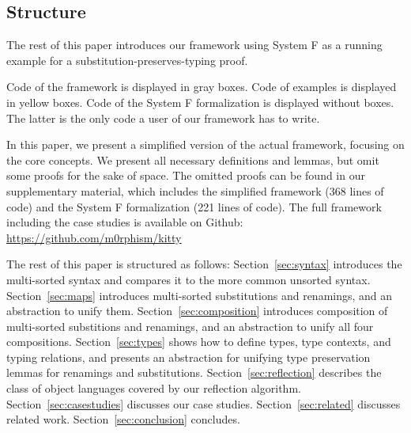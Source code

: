 \documentclass[a4paper, UKenglish, cleveref, autoref, thm-restate]{lipics-v2021}
\begin{document}
  \subsection{Structure}
  \label{sec:introduction:structure}

  The rest of this paper introduces our framework using System F
  as a running example for a substitution-preserves-typing proof.

  Code of the framework is displayed in gray boxes.
  Code of examples is displayed in yellow boxes.
  Code of the System F formalization is displayed without boxes. The
  latter is the only code a user of our framework has to write.

  In this paper, we present a simplified version of the actual
  framework, focusing on the core concepts. We present all necessary
  definitions and lemmas, but omit some proofs for the sake of
  space. The omitted proofs can be found in our supplementary material,
  which includes the simplified framework (368 lines of code) and the
  System F formalization (221 lines of code).
  The full framework including the case studies is available on Github:
  \textcolor{blue}{\url{https://github.com/m0rphism/kitty}}

  The rest of this paper is structured as follows:
  Section~\ref{sec:syntax} introduces the multi-sorted syntax and compares it to the
  more common unsorted syntax.
  Section~\ref{sec:maps} introduces multi-sorted substitutions and renamings, and
  an abstraction to unify them.
  Section~\ref{sec:composition} introduces composition of multi-sorted
  substitions and renamings, and an abstraction to unify all four
  compositions.
  Section~\ref{sec:types} shows how to define types,
  type contexts, and typing relations,
  and presents an abstraction for unifying type preservation lemmas for renamings and substitutions.
  Section~\ref{sec:reflection} describes the class of object languages covered by
  our reflection algorithm.
  Section~\ref{sec:casestudies} discusses our case studies.
  Section~\ref{sec:related} discusses related work.
  Section~\ref{sec:conclusion} concludes.
\end{document}
